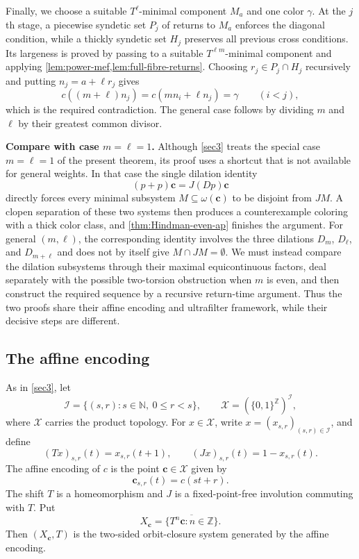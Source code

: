 \documentclass[reqno,12pt]{amsart}
\newcommand{\two}{\{0,1\}}
\def \N {\mathbb N}
\def \Z {\mathbb Z}
\numberwithin{equation}{section}
\begin{document}
Finally, we choose a suitable $T^\ell$-minimal component $M_a$ and one
color $\gamma$.  At the $j$th stage, a piecewise syndetic set $P_j$ of
returns to $M_a$ enforces the diagonal condition, while a thickly syndetic
set $H_j$ preserves all previous cross conditions.  Its largeness is
proved by passing to a suitable $T^{\ell m}$-minimal component and applying
\cref{lem:power-mef,lem:full-fibre-returns}. Choosing
$r_j\in P_j\cap H_j$ recursively and putting $n_j=a+\ell r_j$ gives
\[
 c((m+\ell)n_j)=c(mn_i+\ell n_j)=\gamma\qquad(i<j),
\]
which is the required contradiction.  The general case follows by
dividing $m$ and $\ell$ by their greatest common divisor.

\noindent\textbf{Compare with case $m=\ell=1$.}\enspace
Although \cref{sec3} treats the special case $m=\ell=1$ of the present
theorem, its proof uses a shortcut that is not available for general
weights.  In that case the single dilation identity
\[
 (p+p)\mathbf c=J(Dp)\mathbf c
\]
directly forces every minimal subsystem $M\subseteq\omega(\mathbf c)$ to
be disjoint from $JM$.  A clopen separation of these two systems then
produces a counterexample coloring with a thick color class, and
\cref{thm:Hindman-even-ap} finishes the argument.  For general
$(m,\ell)$, the corresponding identity involves the three dilations
$D_m$, $D_\ell$, and $D_{m+\ell}$ and does not by itself give
$M\cap JM=\emptyset$.  We must instead compare the dilation subsystems
through their maximal equicontinuous factors, deal separately with the
possible two-torsion obstruction when $m$ is even, and then construct the
required sequence by a recursive return-time argument.  Thus the two
proofs share their affine encoding and ultrafilter framework, while their
decisive steps are different.

\subsection{The affine encoding}\label{sec:weighted-affine}

As in \cref{sec3}, let
\[
 \mathcal I=\{(s,r):s\in\N,\ 0\leq r<s\},
 \qquad
 \mathcal X=(\two^{\Z})^{\mathcal I},
\]
where $\mathcal X$ carries the product topology.
For $x\in\mathcal X$, write $x=(x_{s,r})_{(s,r)\in\mathcal I}$, and define
\[
 (Tx)_{s,r}(t)=x_{s,r}(t+1),
 \qquad
 (Jx)_{s,r}(t)=1-x_{s,r}(t).
\]
The affine encoding of $c$ is the point $\mathbf c\in\mathcal X$ given by
\[
 \mathbf c_{s,r}(t)=c(st+r).
\]
The shift $T$ is a homeomorphism and $J$ is a fixed-point-free involution
commuting with $T$.
Put
\[
 X_{\mathbf c}=\overline{\{T^n\mathbf c:n\in\Z\}}.
\]
Then $(X_{\mathbf c},T)$ is the two-sided orbit-closure system generated
by the affine encoding.
\end{document}
